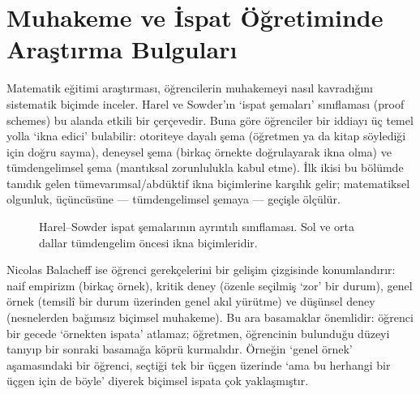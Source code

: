 \section{Muhakeme ve İspat Öğretiminde Araştırma Bulguları}\label{sec:arastirma}

Matematik eğitimi araştırması, öğrencilerin muhakemeyi nasıl kavradığını sistematik biçimde inceler. Harel ve Sowder’ın ‘ispat şemaları’ sınıflaması (proof schemes) bu alanda etkili bir çerçevedir. Buna göre öğrenciler bir iddiayı üç temel yolla ‘ikna edici’ bulabilir: otoriteye dayalı şema (öğretmen ya da kitap söylediği için doğru sayma), deneysel şema (birkaç örnekte doğrulayarak ikna olma) ve tümdengelimsel şema (mantıksal zorunlulukla kabul etme). İlk ikisi bu bölümde tanıdık gelen tümevarımsal/abdüktif ikna biçimlerine karşılık gelir; matematiksel olgunluk, üçüncüsüne — tümdengelimsel şemaya — geçişle ölçülür.

\begin{figure}[h]
\centering
{}%
\caption{Harel–Sowder ispat şemalarının ayrıntılı sınıflaması. Sol ve orta dallar tümdengelim öncesi ikna biçimleridir.}
\end{figure}

Nicolas Balacheff ise öğrenci gerekçelerini bir gelişim çizgisinde konumlandırır: naif empirizm (birkaç örnek), kritik deney (özenle seçilmiş ‘zor’ bir durum), genel örnek (temsilî bir durum üzerinden genel akıl yürütme) ve düşünsel deney (nesnelerden bağımsız biçimsel muhakeme). Bu ara basamaklar önemlidir: öğrenci bir gecede ‘örnekten ispata’ atlamaz; öğretmen, öğrencinin bulunduğu düzeyi tanıyıp bir sonraki basamağa köprü kurmalıdır. Örneğin ‘genel örnek’ aşamasındaki bir öğrenci, seçtiği tek bir üçgen üzerinde ‘ama bu herhangi bir üçgen için de böyle’ diyerek biçimsel ispata çok yaklaşmıştır.

